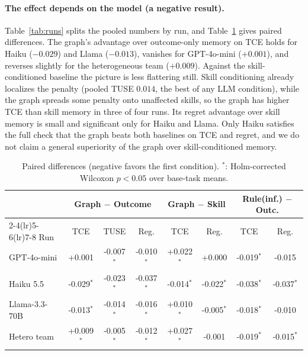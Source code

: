\documentclass[letterpaper]{article}
\begin{document}
\paragraph{The effect depends on the model (a negative result).}
Table~\ref{tab:runs} splits the pooled numbers by run, and Table~\ref{tab:contrast} gives paired differences. The graph's advantage over outcome-only memory on TCE holds for Haiku ($-0.029$) and Llama ($-0.013$), vanishes for GPT-4o-mini ($+0.001$), and reverses slightly for the heterogeneous team ($+0.009$). Against the skill-conditioned baseline the picture is less flattering still. Skill conditioning already localizes the penalty (pooled TUSE $0.014$, the best of any LLM condition), while the graph spreads some penalty onto unaffected skills, so the graph has higher TCE than skill memory in three of four runs. Its regret advantage over skill memory is small and significant only for Haiku and Llama. Only Haiku satisfies the full check that the graph beats both baselines on TCE and regret, and we do not claim a general superiority of the graph over skill-conditioned memory.

\begin{table}[t]
\centering\scriptsize
\setlength{\tabcolsep}{2.6pt}
\begin{tabular}{lccccccc}
\toprule
 & \multicolumn{3}{c}{Graph $-$ Outcome} & \multicolumn{2}{c}{Graph $-$ Skill} & \multicolumn{2}{c}{Rule(inf.) $-$ Outc.}\\
\cmidrule(lr){2-4}\cmidrule(lr){5-6}\cmidrule(lr){7-8}
Run & TCE & TUSE & Reg. & TCE & Reg. & TCE & Reg.\\
\midrule
GPT-4o-mini & +0.001 & -0.007$^{*}$ & -0.010$^{*}$ & +0.022$^{*}$ & +0.000 & -0.019$^{*}$ & -0.015 \\
Haiku 5.5 & -0.029$^{*}$ & -0.023$^{*}$ & -0.037$^{*}$ & -0.014$^{*}$ & -0.022$^{*}$ & -0.038$^{*}$ & -0.037$^{*}$ \\
Llama-3.3-70B & -0.013$^{*}$ & -0.014$^{*}$ & -0.016$^{*}$ & +0.010$^{*}$ & -0.005$^{*}$ & -0.018$^{*}$ & -0.010 \\
Hetero team & +0.009$^{*}$ & -0.005$^{*}$ & -0.012$^{*}$ & +0.027$^{*}$ & -0.001 & -0.019$^{*}$ & -0.015$^{*}$ \\
\bottomrule
\end{tabular}
\caption{Paired differences (negative favors the first condition). $^{*}$: Holm-corrected Wilcoxon $p<0.05$ over base-task means.}
\label{tab:contrast}
\end{table}
\end{document}

